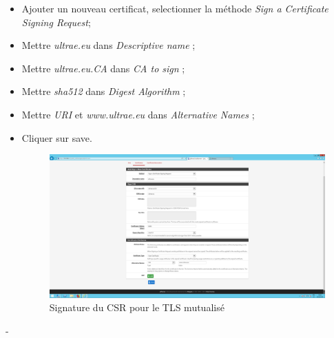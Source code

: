 \begin{itemize}
    \item Ajouter un nouveau certificat, selectionner la méthode \textit{Sign a Certificate Signing Request};
    \item Mettre \textit{ultrae.eu} dans \textit{Descriptive name} ;
    \item Mettre \textit{ultrae.eu.CA} dans \textit{CA to sign} ;
    \item Mettre \textit{sha512} dans \textit{Digest Algorithm} ;
    \item Mettre \textit{URI} et \textit{www.ultrae.eu} dans \textit{Alternative Names} ;
    \item Cliquer sur save.
    \begin{figure}[h!]
	    \begin{center}
		    \includegraphics[scale=0.2]{Interception_Screenshots/mut05.png}
		    \caption{Signature du CSR pour le TLS mutualisé}
	    \end{center}
    \end{figure}
    \FloatBarrier
\end{itemize}
-